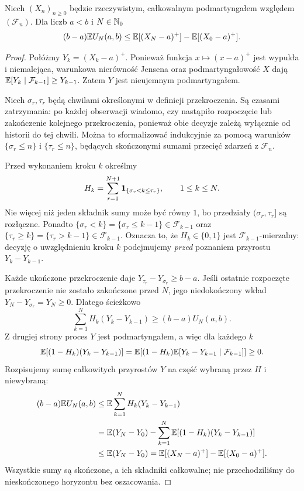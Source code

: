 \begin{twierdzenie}
Niech $(X_n)_{n\geq0}$ będzie rzeczywistym,
całkowalnym podmartyngałem względem
$(\mathcal F_n)$. Dla liczb $a<b$ i $N\in\mathbb{N}_0$
\[
(b-a)\mathbb{E} U_N(a,b)
\leq\mathbb{E}[(X_N-a)^+]-\mathbb{E}[(X_0-a)^+].
\]
\end{twierdzenie}
\begin{proof}
Połóżmy $Y_k=(X_k-a)^+$. Ponieważ funkcja
$x\mapsto(x-a)^+$ jest wypukła i niemalejąca,
warunkowa nierówność Jensena oraz podmartyngałowość
$X$ dają
$\mathbb{E}[Y_k\mid\mathcal F_{k-1}]\geq Y_{k-1}$.
Zatem $Y$ jest nieujemnym podmartyngałem.

Niech $\sigma_r,\tau_r$ będą chwilami określonymi
w definicji przekroczenia. Są czasami zatrzymania:
po każdej obserwacji wiadomo, czy nastąpiło
rozpoczęcie lub zakończenie kolejnego przekroczenia,
ponieważ obie decyzje zależą wyłącznie od historii
do tej chwili. Można to sformalizować indukcyjnie
za pomocą warunków $\{\sigma_r\leq n\}$ i
$\{\tau_r\leq n\}$, będących skończonymi sumami
przecięć zdarzeń z $\mathcal F_n$.

Przed wykonaniem kroku $k$ określmy
\[
H_k=\sum_{r=1}^{N+1}
 \mathbf{1}_{\{\sigma_r<k\leq\tau_r\}},
 \qquad 1\leq k\leq N.
\]
Nie więcej niż jeden składnik sumy może być równy
$1$, bo przedziały $(\sigma_r,\tau_r]$ są rozłączne.
Ponadto
$\{\sigma_r<k\}=\{\sigma_r\leq k-1\}\in\mathcal F_{k-1}$
oraz $\{\tau_r\geq k\}=\{\tau_r>k-1\}\in\mathcal F_{k-1}$.
Oznacza to, że $H_k\in\{0,1\}$ jest
$\mathcal F_{k-1}$-mierzalny: decyzję o
uwzględnieniu kroku $k$ podejmujemy \emph{przed}
poznaniem przyrostu $Y_k-Y_{k-1}$.

Każde ukończone przekroczenie daje
$Y_{\tau_r}-Y_{\sigma_r}\geq b-a$.
Jeśli ostatnie rozpoczęte przekroczenie nie
zostało zakończone przed $N$, jego niedokończony
wkład $Y_N-Y_{\sigma_r}=Y_N\geq0$.
Dlatego ścieżkowo
\[
\sum_{k=1}^N H_k(Y_k-Y_{k-1})
 \geq(b-a)U_N(a,b).
\]
Z drugiej strony proces $Y$ jest podmartyngałem,
a więc dla każdego $k$
\[
\mathbb{E}[(1-H_k)(Y_k-Y_{k-1})]
=\mathbb{E}[(1-H_k)\mathbb{E}[Y_k-Y_{k-1}\mid\mathcal F_{k-1}]]\geq0.
\]
Rozpisujemy sumę całkowitych przyrostów $Y$ na
część wybraną przez $H$ i niewybraną:
\begin{align*}
(b-a)\mathbb{E} U_N(a,b)
&\leq\mathbb{E}\sum_{k=1}^NH_k(Y_k-Y_{k-1})\\
&=\mathbb{E}(Y_N-Y_0)
 -\sum_{k=1}^N\mathbb{E}[(1-H_k)(Y_k-Y_{k-1})]\\
&\leq\mathbb{E}(Y_N-Y_0)
=\mathbb{E}[(X_N-a)^+]-\mathbb{E}[(X_0-a)^+].
\end{align*}
Wszystkie sumy są skończone, a ich składniki
całkowalne; nie przechodziliśmy do nieskończonego
horyzontu bez oszacowania.
\end{proof}


